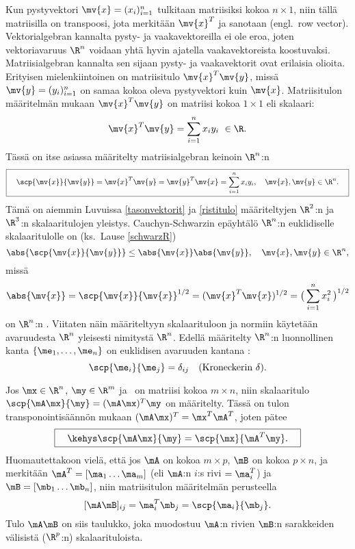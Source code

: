 Kun pystyvektori $\mv{x} = (x_i)_{i=1}^n$ tulkitaan matriisiksi kokoa $n \times 1$, niin tällä
matriisilla on transpoosi, jota merkitään $\mv{x}^T$ ja sanotaan
%
(engl.\ row vector). Vektorialgebran kannalta pysty- ja vaakavektoreilla ei ole eroa, joten 
vektoriavaruus $\R^n$ voidaan yhtä hyvin ajatella vaakavektoreista koostuvaksi. Matriisialgebran
kannalta sen sijaan pysty- ja vaakavektorit ovat erilaisia olioita. Erityisen mielenkiintoinen
on matriisitulo $\mv{x}^T \mv{y}$, missä $\mv{y} = (y_i)_{i=1}^n$ on samaa kokoa oleva 
pystyvektori kuin $\mv{x}$. Matriisitulon määritelmän mukaan  $\mv{x}^T \mv{y}$ on matriisi
kokoa $1 \times 1$ eli skalaari:
\[ 
\mv{x}^T \mv{y} = \sum_{i=1}^n x_i y_i\ \in \R. 
\]
Tässä on itse asiassa määritelty matriisialgebran keinoin $\R^n$:n 
\[ 
\boxed{ \quad \scp{\mv{x}}{\mv{y}} = \mv{x}^T \mv{y} = \mv{y}^T \mv{x} 
                                   =  \sum_{i=1}^n x_i y_i, \quad \mv{x},\mv{y} \in \R^n. \quad}
\]
Tämä on aiemmin Luvuissa \ref{tasonvektorit} ja \ref{ristitulo} määriteltyjen $\R^2$:n
ja $\R^3$:n skalaaritulojen yleistys.
%
Cauchyn-Schwarzin epäyhtälö $\R^n$:n euklidiselle skalaaritulolle on (ks.\ Lause \ref{schwarzR})
\[ 
\abs{\scp{\mv{x}}{\mv{y}}} \le \abs{\mv{x}} \abs{\mv{y}}, \quad \mv{x},\mv{y} \in \R^n, 
\]
missä
\[ 
\abs{\mv{x}} = \scp{\mv{x}}{\mv{x}}^{1/2} = (\mv{x}^T \mv{x})^{1/2}  
                                          = \bigl(\,\sum_{i=1}^n x_i^2 \,\bigr)^{1/2}
\]
on $\R^n$:n . Viitaten näin määriteltyyn skalaarituloon ja normiin 
käytetään avaruudesta $\R^n$ yleisesti nimitystä
%
 $\R^n$. Edellä 
määritelty $\R^n$:n luonnollinen kanta $\{\me_1, \ldots, \me_n\}$ on euklidisen avaruuden 
%
kantana :
\[ 
\scp{\me_i}{\me_j} = \delta_{ij} \quad \text{(Kroneckerin $\delta$)}.
\]

Jos $\mx\in\R^n$, $\my\in\R^m$ ja \mA\ on matriisi kokoa $m \times n$, niin skalaaritulo 
$\scp{\mA\mx}{\my} = (\mA\mx)^T \my$ on määritelty. Tässä on tulon transponointisäännön mukaan
$(\mA\mx)^T = \mx^T \mA^T$, joten pätee
\[ 
\boxed{\quad \kehys \scp{\mA\mx}{\my} = \scp{\mx}{\mA^T \my}. \quad} 
\] 
Huomautettakoon vielä, että jos $\mA$ on kokoa $m \times p$, $\mB$ on kokoa $p \times n$, ja
merkitään $\mA^T=[\ma_1 \ldots \ma_m]$ (eli $\mA$:n $i$:s rivi $=\ma_i^T$) ja 
$\mB=[\mb_1 \ldots \mb_n]$, niin matriisitulon määritelmän perusteella
\[
[\mA\mB]_{ij} = \ma_i^T\mb_j = \scp{\ma_i}{\mb_j}.
\]
Tulo $\mA\mB$ on siis taulukko, joka muodostuu $\mA$:n rivien $\mB$:n sarakkeiden välisistä
($\R^p$:n) skalaarituloista.

